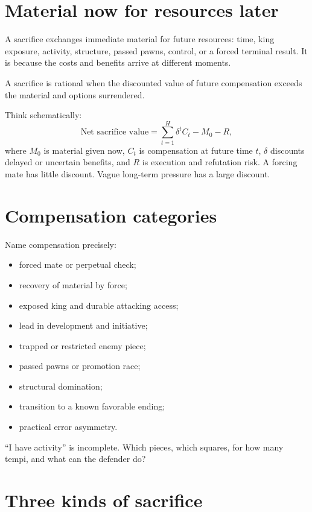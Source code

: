 \section{Material now for resources later}
A sacrifice exchanges immediate material for future resources: time, king exposure, activity, structure, passed pawns, control, or a forced terminal result. It is  because the costs and benefits arrive at different moments.

A sacrifice is rational when the discounted value of future compensation exceeds the material and options surrendered.

\begin{formalbox}
Think schematically:
\[
\text{Net sacrifice value}
=\sum_{t=1}^{H}\delta^t C_t-M_0-R,
\]
where $M_0$ is material given now, $C_t$ is compensation at future time $t$, $\delta$ discounts delayed or uncertain benefits, and $R$ is execution and refutation risk.
A forcing mate has little discount. Vague long-term pressure has a large discount.
\end{formalbox}

\section{Compensation categories}
Name compensation precisely:

\begin{itemize}[leftmargin=1.4em]
\item forced mate or perpetual check;
\item recovery of material by force;
\item exposed king and durable attacking access;
\item lead in development and initiative;
\item trapped or restricted enemy piece;
\item passed pawns or promotion race;
\item structural domination;
\item transition to a known favorable ending;
\item practical error asymmetry.
\end{itemize}

``I have activity'' is incomplete. Which pieces, which squares, for how many tempi, and what can the defender do?

\section{Three kinds of sacrifice}
